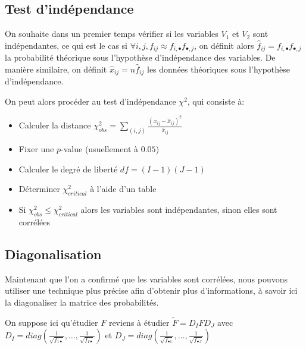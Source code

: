 \subsection{Test d'indépendance}

On souhaite dans un premier temps vérifier si les variables $V_1$ et $V_2$ sont indépendantes, ce qui est le cas si $\forall i, j, f_{ij} \approx f_{i,\bullet}f_{\bullet, j}$, on définit alors $\hat{f}_{ij} = f_{i,\bullet}f_{\bullet, j}$ la probabilité théorique sous l'hypothèse d'indépendance des variables. 
De manière similaire, on définit $\hat{x}_{ij} = n\hat{f}_{ij}$ les données théoriques sous l'hypothèse d'indépendance. 

On peut alors procéder au test d'indépendance $\chi^2$, qui consiste à:
\begin{itemize}
  \item Calculer la distance $\chi_{obs}^2 = \sum_{(i,j)} \frac{(x_{ij} - \hat{x}_{ij})^2}{\hat{x}_{ij}}$ 
  \item Fixer une $p$-value (usuellement à $0.05$)
  \item Calculer le degré de liberté $df = (I - 1)(J - 1)$ 
  \item Déterminer $\chi_{critical}^2$ à l'aide d'un table 
  \item Si $\chi_{obs}^2 \leq \chi_{critical}^2$ alors les variables sont indépendantes, sinon elles sont corrélées
\end{itemize}

\subsection{Diagonalisation}

Maintenant que l'on a confirmé que les variables sont corrélées, nous pouvons utiliser une technique plus précise afin d'obtenir plus d'informations, à savoir ici la diagonaliser la matrice des probabilités.

On suppose ici qu'étudier $F$ reviens à étudier $\tilde{F} = D_IFD_J$ avec $D_I = diag(\frac{1}{\sqrt{f_{1 \bullet}}}, \dots, \frac{1}{\sqrt{f_{I\bullet}}})$ et $D_J = diag(\frac{1}{\sqrt{f_{\bullet 1}}}, \dots, \frac{1}{\sqrt{f_{\bullet J}}})$
